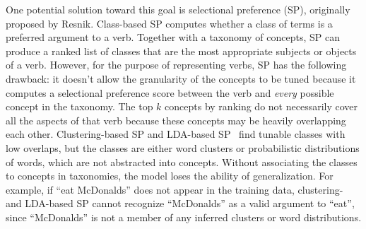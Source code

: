 One potential solution toward this goal is selectional preference
(SP), originally proposed by Resnik.
Class-based SP computes whether a class of terms is a preferred argument
to a verb. Together with a taxonomy of concepts,
SP can produce a ranked list of classes that are the most appropriate
subjects or objects of a verb. However, for the purpose of representing verbs,
SP has the following drawback: it doesn't allow the granularity of the concepts
to be tuned because it computes a selectional preference score between the
verb and {\em every} possible concept in the taxonomy. The top $k$ concepts by
ranking do not necessarily cover all the aspects of that verb because these
concepts may be heavily overlapping each other.
Clustering-based SP and LDA-based SP~\cite{Ritter:2010}
find tunable classes with low overlaps, but the classes are either
word clusters or probabilistic distributions of words,
which are not abstracted into concepts. Without
associating the classes to concepts in taxonomies,
the model loses the ability of generalization.
For example, if ``eat McDonalds'' does not appear in the training
data, clustering- and LDA-based SP cannot recognize ``McDonalds''
as a valid argument to ``eat'', since ``McDonalds'' is not
a member of any inferred clusters or word distributions.


%


